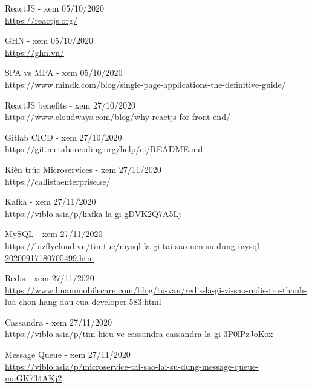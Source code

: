 \documentclass[12pt,a4paper,oneside]{book}
\begin{document}
	\frontmatter
	
	
	

	\tableofcontents
	\listoffigures
	\newpage
	
	\mainmatter
	
	
	
	
    
    
    
    
    \begin{thebibliography}{80}
        \bibitem{} ReactJS - xem 05/10/2020\\
        \url{https://reactjs.org/}
        
        \bibitem{} GHN - xem 05/10/2020\\
        \url{https://ghn.vn/}
    
        \bibitem{} SPA vs MPA - xem 05/10/2020\\
        \url{https://www.mindk.com/blog/single-page-applications-the-definitive-guide/}
    
        \bibitem{} ReactJS benefits - xem 27/10/2020\\
        \url{https://www.cloudways.com/blog/why-reactjs-for-front-end/}
    
        \bibitem{} Gitlab CICD - xem 27/10/2020\\
        \url{https://git.metabarcoding.org/help/ci/README.md}    
        
        \bibitem{} Kiến trúc Microservices - xem 27/11/2020\\
        \url{https://callistaenterprise.se/}
        
        \bibitem{} Kafka - xem 27/11/2020\\
        \url{https://viblo.asia/p/kafka-la-gi-gDVK2Q7A5Lj}
        
        \bibitem{} MySQL - xem 27/11/2020\\
        \url{https://bizflycloud.vn/tin-tuc/mysql-la-gi-tai-sao-nen-su-dung-mysql-20200917180705499.htm}
        
        \bibitem{} Redis - xem 27/11/2020\\
        \url{https://www.hnammobilecare.com/blog/tu-van/redis-la-gi-vi-sao-redis-tro-thanh-lua-chon-hang-dau-cua-developer.583.html}
        
        \bibitem{} Cassandra - xem 27/11/2020\\
        \url{https://viblo.asia/p/tim-hieu-ve-cassandra-cassandra-la-gi-3P0lPzJoKox}
        
        \bibitem{} Message Queue - xem 27/11/2020\\
        \url{https://viblo.asia/p/microservice-tai-sao-lai-su-dung-message-queue-maGK734AKj2}
        
        
    \end{thebibliography}
\end{document}
